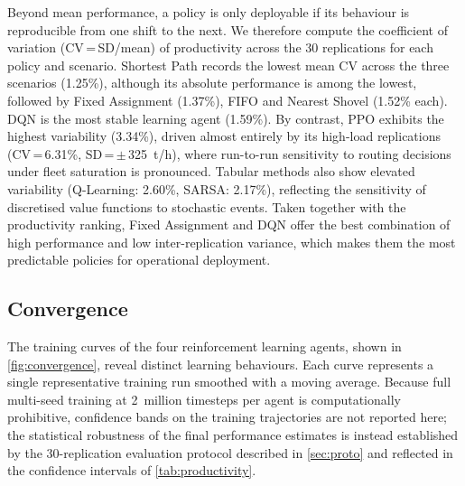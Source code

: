 \documentclass[11pt,a4paper]{article}
\begin{document}
Beyond mean performance, a policy is only deployable if its behaviour is reproducible from one shift to the next. We therefore compute the coefficient of variation (CV\,=\,SD/mean) of productivity across the 30 replications for each policy and scenario. Shortest Path records the lowest mean CV across the three scenarios (1.25\%), although its absolute performance is among the lowest, followed by Fixed Assignment (1.37\%), FIFO and Nearest Shovel (1.52\% each). DQN is the most stable learning agent (1.59\%). By contrast, PPO exhibits the highest variability (3.34\%), driven almost entirely by its high-load replications (CV\,=\,6.31\%, SD\,=\,$\pm$\,325~t/h), where run-to-run sensitivity to routing decisions under fleet saturation is pronounced. Tabular methods also show elevated variability (Q-Learning: 2.60\%, SARSA: 2.17\%), reflecting the sensitivity of discretised value functions to stochastic events. Taken together with the productivity ranking, Fixed Assignment and DQN offer the best combination of high performance and low inter-replication variance, which makes them the most predictable policies for operational deployment.

\subsection{Convergence}

The training curves of the four reinforcement learning agents, shown in \cref{fig:convergence}, reveal distinct learning behaviours. Each curve represents a single representative training run smoothed with a moving average. Because full multi-seed training at 2~million timesteps per agent is computationally prohibitive, confidence bands on the training trajectories are not reported here; the statistical robustness of the final performance estimates is instead established by the 30-replication evaluation protocol described in \cref{sec:proto} and reflected in the confidence intervals of \cref{tab:productivity}.
\end{document}

